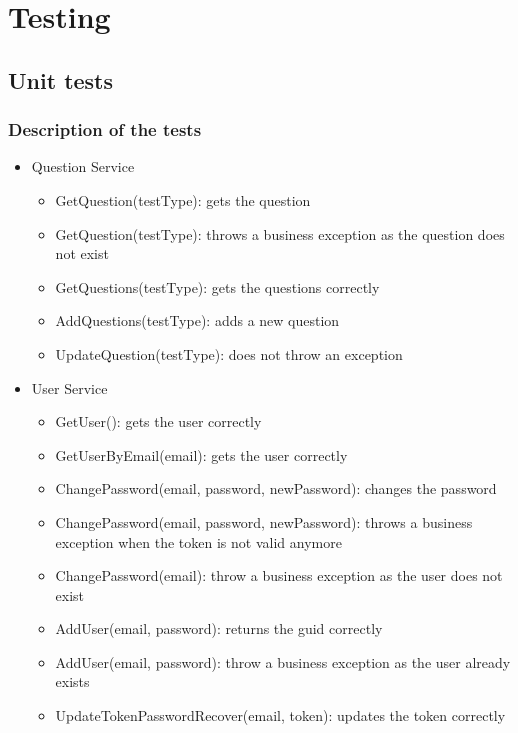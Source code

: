 \chapter{Testing}


\section{Unit tests}
\subsection{Description of the tests}
    \begin{itemize}[noitemsep]
        \item Question Service
            \begin{itemize}[noitemsep]
                \item GetQuestion(testType): gets the question
                \item GetQuestion(testType): throws a business exception as the question does not exist
                \item GetQuestions(testType): gets the questions correctly
                \item AddQuestions(testType): adds a new question
                \item UpdateQuestion(testType): does not throw an exception
            \end{itemize}
        \item User Service
            \begin{itemize}[noitemsep]
                \item GetUser(): gets the user correctly
                \item GetUserByEmail(email): gets the user correctly
                \item ChangePassword(email, password, newPassword): changes the password
                \item ChangePassword(email, password, newPassword): throws a business exception when the token is not valid anymore
                \item ChangePassword(email): throw a business exception as the user does not exist
                \item AddUser(email, password): returns the guid correctly
                \item AddUser(email, password): throw a business exception as the user already exists
                \item UpdateTokenPasswordRecover(email, token): updates the token correctly

\end{itemize}
\end{itemize}
